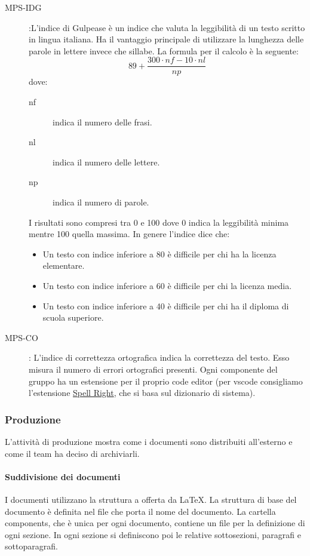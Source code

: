 \documentclass[../../norme-di-progetto.tex]{subfiles}
\begin{document}
\begin{description}
  \item [MPS-IDG]:L'indice di Gulpease è un indice che valuta la leggibilità di un testo scritto in lingua italiana. Ha il vantaggio principale di utilizzare la lunghezza delle parole in lettere invece che sillabe. La formula per il calcolo è la seguente:
  \[
    89 +\frac{300\cdot nf-10\cdot nl}{np}
  \]
  dove:
  \begin{description}
    \item [nf] indica il numero delle frasi.
    \item [nl] indica il numero delle lettere.
    \item [np] indica il numero di parole.
  \end{description}
  I risultati sono compresi tra 0 e 100 dove 0 indica la leggibilità minima mentre 100 quella massima. In genere l'indice dice che:
  \begin{itemize}
    \item Un testo con indice inferiore a 80 è difficile per chi ha la licenza elementare.
    \item Un testo con indice inferiore a 60 è difficile per chi la licenza media.
    \item Un testo con indice inferiore a 40 è difficile per chi ha il diploma di scuola superiore.
  \end{itemize}
  \item [MPS-CO]: L'indice di correttezza ortografica indica la correttezza del testo.
  Esso misura il numero di errori ortografici presenti.
  Ogni componente del gruppo ha un estensione per il proprio code editor (per vscode consigliamo l'estensione \href{https://marketplace.visualstudio.com/items?itemName=ban.spellright}{Spell Right}, che si basa sul dizionario di sistema).
\end{description}

\subsubsection{Produzione}%
\label{subs:produzione}

L'attività di produzione mostra come i documenti sono distribuiti all'esterno e come il team ha deciso di archiviarli.

\paragraph{Suddivisione dei documenti}%
\label{par:suddivisione_dei_documenti}
I documenti utilizzano la struttura a  offerta da \LaTeX.
La struttura di base del documento è definita nel file che porta il nome del documento.
La cartella components, che è unica per ogni documento, contiene un file per la definizione di ogni sezione. In ogni sezione si definiscono poi le relative sottosezioni, paragrafi e sottoparagrafi.
\end{document}
